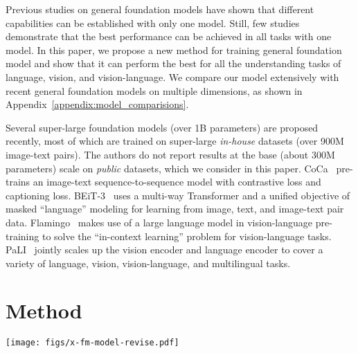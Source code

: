 \documentclass[11pt]{article}
\newcommand{\ModelName}{X-FM\xspace}
\begin{document}
Previous studies on general foundation models have shown that different capabilities can be established with only one model. Still, few studies demonstrate that the best performance can be achieved in all tasks with one model. In this paper, we propose a new method for training general foundation model and show that it can perform the best for all the understanding tasks of language, vision, and vision-language. We compare our model extensively with recent general foundation models on multiple dimensions, as shown in Appendix~\ref{appendix:model_comparisions}.


Several super-large foundation models (over 1B parameters) are proposed recently, most of which are trained on super-large {\it in-house} datasets (over 900M image-text pairs). The authors do not report results at the base (about 300M parameters) scale on {\it public} datasets, which we consider in this paper. CoCa~\citep{yu2022coca} pre-trains an image-text sequence-to-sequence model with contrastive loss and captioning loss. BEiT-3~\citep{wang2022image} uses a multi-way Transformer and a unified objective of masked ``language'' modeling for learning from image, text, and image-text pair data. Flamingo~\citep{alayrac2022flamingo} makes use of a large language model in vision-language pre-training to solve the ``in-context learning'' problem for vision-language tasks. PaLI~\citep{chen2022pali} jointly scales up the vision encoder and language encoder to cover a variety of language, vision, vision-language, and multilingual tasks.
 \vspace{-0.3em}
\vspace{-0.3em}
\section{Method}
\label{sec:model_description}


\begin{figure*}[ht]
\begin{center}
\centerline{\texttt{[image: figs/x-fm-model-revise.pdf]}}
\caption{{\bf The architecture and pre-training process of {\ModelName}, a Transformer-based general foundation model.} 
Given a text, we learn the language encoder by MLM.
Given an image, we learn the vision encoder by MIM.
Given an image-text pair, we learn the fusion encoder by BBP, ITM, IMLM and ITC, and further learn the vision encoder by MIM. The gradients of BBP, ITM, and IMLM are stopped from the fusion encoder to the language encoder. The vision encoder is trained by MIM with both the image-text pair data and the image data. M, N and L denote numbers of encoder layers.}
\label{Fig:model}
\end{center}
\end{figure*}
\end{document}
